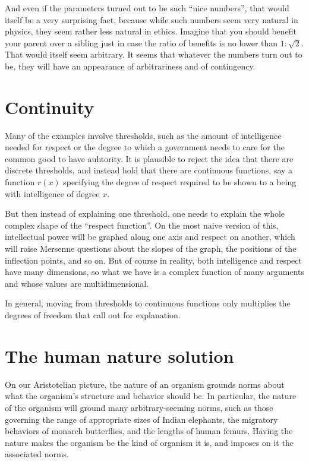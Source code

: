 And even if the parameters turned out to be such ``nice numbers'', that would itself be a very surprising fact, because while
such numbers seem very natural in physics, they seem rather less natural in ethics. Imagine that you should benefit your 
parent over a sibling just in case the ratio of benefits is no lower than $1:\sqrt{2}$. That would itself seem arbitrary.
It seems that whatever the numbers turn out to be, they will have an appearance of arbitrariness and of contingency.

\section{Continuity}
Many of the examples involve thresholds, such as the amount of intelligence needed for respect or the degree to which a government
needs to care for the common good to have auhtority. It is plausible to reject the idea that there are discrete thresholds, and instead hold 
that there are continuous functions, say a function $r(x)$ specifying the degree of respect required to be shown to a being with intelligence
of degree $x$. 

But then instead of explaining one threshold, one needs to
explain the whole complex shape of the ``respect function''. On the most naive version of this, intellectual power will be graphed along one axis
and respect on another, which will raise Mersenne questions about the slopes of the graph, the positions of the inflection points, and so on. 
But of course in reality, both intelligence and respect have many dimensions, so what we have is a complex function of many arguments and whose
values are multidimensional. 

In general, moving from thresholds to continuous functions only multiplies the degrees of freedom that call out for explanation.

\section{The human nature solution}
On our Aristotelian picture, the nature of an organism grounds norms about what the organism's structure and behavior 
should be. In particular, the nature of the organism will ground many arbitrary-seeming norms, such as those governing
the range of appropriate sizes of Indian elephants, the migratory behaviors of monarch butterflies, and the lengths of 
human femurs. Having the nature makes the organism be the kind of organism it is, and imposes on it the associated norms.

